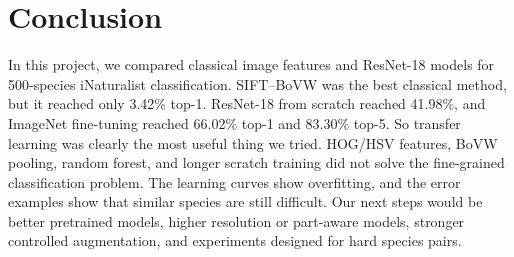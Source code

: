 \documentclass[10pt,twocolumn,letterpaper]{article}
\begin{document}
\section{Conclusion}
In this project, we compared classical image features and ResNet-18 models for 500-species iNaturalist classification.  SIFT--BoVW was the best classical method, but it reached only 3.42\% top-1.  ResNet-18 from scratch reached 41.98\%, and ImageNet fine-tuning reached 66.02\% top-1 and 83.30\% top-5.  So transfer learning was clearly the most useful thing we tried.  HOG/HSV features, BoVW pooling, random forest, and longer scratch training did not solve the fine-grained classification problem.  The learning curves show overfitting, and the error examples show that similar species are still difficult.  Our next steps would be better pretrained models, higher resolution or part-aware models, stronger controlled augmentation, and experiments designed for hard species pairs.

{\small


}
\end{document}
